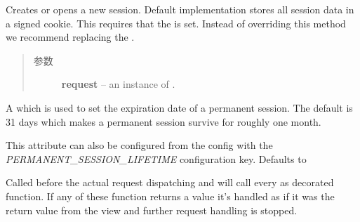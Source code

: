 \documentclass[a4paper,12pt]{sphinxmanual}
\begin{document}
\begin{fulllineitems}
\begin{fulllineitems}
\begin{quote}
\begin{description}
\end{description}\end{quote}

\end{fulllineitems}


\begin{fulllineitems}
\label{api:flask.Flask.open_session}
Creates or opens a new session.  Default implementation stores all
session data in a signed cookie.  This requires that the
{\hyperref[api:flask.Flask.secret_key]{}} is set.  Instead of overriding this method
we recommend replacing the {\hyperref[api:flask.Flask.session_interface]{}}.
\begin{quote}\begin{description}
\item[{参数}] \leavevmode
\textbf{request} -- an instance of {\hyperref[api:flask.Flask.request_class]{}}.

\end{description}\end{quote}

\end{fulllineitems}


\begin{fulllineitems}
\label{api:flask.Flask.permanent_session_lifetime}
A \href{http://docs.python.org/dev/library/datetime.html\#datetime.timedelta}{} which is used to set the expiration
date of a permanent session.  The default is 31 days which makes a
permanent session survive for roughly one month.

This attribute can also be configured from the config with the
\emph{PERMANENT\_SESSION\_LIFETIME} configuration key.  Defaults to

\end{fulllineitems}


\begin{fulllineitems}
\label{api:flask.Flask.preprocess_request}
Called before the actual request dispatching and will
call every as {\hyperref[api:flask.Flask.before_request]{}} decorated function.
If any of these function returns a value it's handled as
if it was the return value from the view and further
request handling is stopped.


\end{fulllineitems}
\end{fulllineitems}
\end{document}
